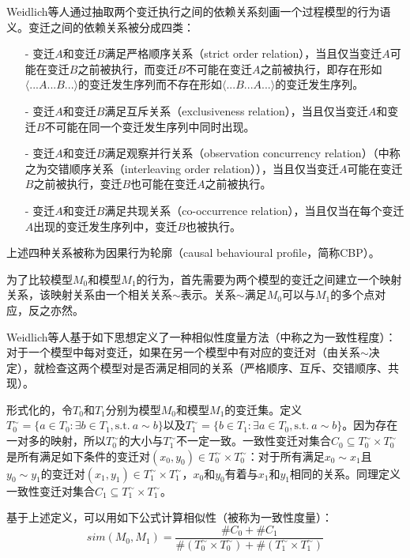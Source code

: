 Weidlich等人通过抽取两个变迁执行之间的依赖关系刻画一个过程模型的行为语义\cite{weidlich2011efficient,weidlich2010efficient}。变迁之间的依赖关系被分成四类：
\begin{itemize}
  \item[-] 变迁$A$和变迁$B$满足严格顺序关系（strict order relation），当且仅当变迁$A$可能在变迁$B$之前被执行，而变迁$B$不可能在变迁$A$之前被执行，即存在形如$\langle ...A...B...\rangle$的变迁发生序列而不存在形如$\langle ...B...A...\rangle$的变迁发生序列。
  \item[-] 变迁$A$和变迁$B$满足互斥关系（exclusiveness relation），当且仅当变迁$A$和变迁$B$不可能在同一个变迁发生序列中同时出现。
  \item[-] 变迁$A$和变迁$B$满足观察并行关系（observation concurrency relation）（中称之为交错顺序关系（interleaving order relation）），当且仅当变迁$A$可能在变迁$B$之前被执行，变迁$B$也可能在变迁$A$之前被执行。
  \item[-] 变迁$A$和变迁$B$满足共现关系（co-occurrence relation），当且仅当在每个变迁$A$出现的变迁发生序列中，变迁$B$也被执行。
\end{itemize}
上述四种关系被称为因果行为轮廓（causal behavioural profile，简称CBP）。

为了比较模型$M_{0}$和模型$M_{1}$的行为，首先需要为两个模型的变迁之间建立一个映射关系，该映射关系由一个相关关系$\sim$表示。关系$\sim$满足$M_{0}$可以与$M_{1}$的多个点对应，反之亦然。

Weidlich等人基于如下思想定义了一种相似性度量方法（中称之为一致性程度）：对于一个模型中每对变迁，如果在另一个模型中有对应的变迁对（由关系$\sim$决定），就检查这两个模型对是否满足相同的关系（严格顺序、互斥、交错顺序、共现）。

形式化的，令$T_{0}$和$T_{1}$分别为模型$M_{0}$和模型$M_{1}$的变迁集。定义$T_{0}^{\sim}=\{a\in T_{0}:\exists b\in T_{1},\text{s.t.}~a\sim b\}$以及$T_{1}^{\sim}=\{b\in T_{1}:\exists a\in T_{0},\text{s.t.}~a\sim b\}$。因为存在一对多的映射，所以$T_{0}^{\sim}$的大小与$T_{1}^{\sim}$不一定一致。一致性变迁对集合$C_{0}\subseteq T_{0}^{\sim}\times T_{0}^{\sim}$是所有满足如下条件的变迁对$(x_{0},y_{0})\in T_{0}^{\sim}\times T_{0}^{\sim}$：对于所有满足$x_{0}\sim x_{1}$且$y_{0}\sim y_{1}$的变迁对$(x_{1},y_{1})\in T_{1}^{\sim}\times T_{1}^{\sim}$，$x_{0}$和$y_{0}$有着与$x_{1}$和$y_{1}$相同的关系。同理定义一致性变迁对集合$C_{1}\subseteq T_{1}^{\sim}\times T_{1}^{\sim}$。

基于上述定义，可以用如下公式计算相似性（被称为一致性度量）：
\begin{displaymath}
  sim(M_{0},M_{1})=\frac{\#C_{0}+\#C_{1}}{\#(T_{0}^{\sim}\times T_{0}^{\sim})+\#(T_{1}^{\sim}\times T_{1}^{\sim})}
\end{displaymath}

